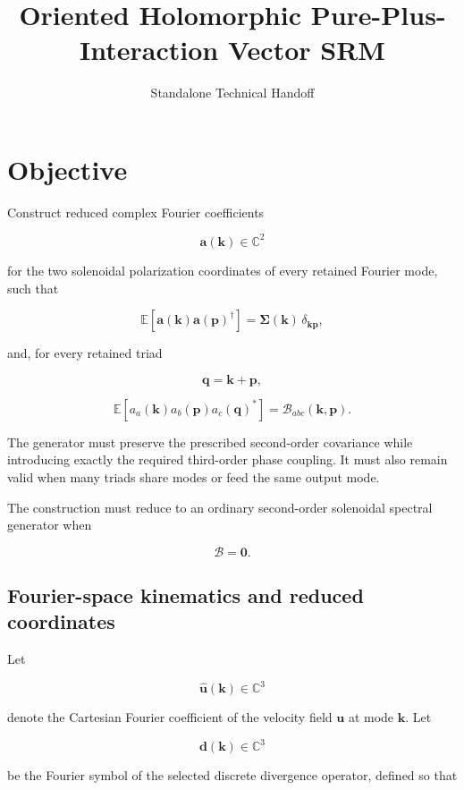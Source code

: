 \documentclass[
  11pt,
  a4paper,
]{article}
\title{Oriented Holomorphic Pure-Plus-Interaction Vector SRM}
\subtitle{Standalone Technical Handoff}
\author{}
\date{}
\begin{document}
\maketitle
\thispagestyle{empty}
\clearpage

{
\hypersetup{linkcolor=black}
\setcounter{tocdepth}{3}
\tableofcontents
}
\section{Objective}\label{objective}

Construct reduced complex Fourier coefficients

\[
\boldsymbol a(\boldsymbol k)\in\mathbb C^2
\]

for the two solenoidal polarization coordinates of every retained
Fourier mode, such that

\[
\mathbb E\!\left[
\boldsymbol a(\boldsymbol k)
\boldsymbol a(\boldsymbol p)^\dagger
\right]
=
\boldsymbol\Sigma(\boldsymbol k)\,
\delta_{\boldsymbol k\boldsymbol p},
\]

and, for every retained triad

\[
\boldsymbol q=\boldsymbol k+\boldsymbol p,
\]

\[
\mathbb E\!\left[
a_a(\boldsymbol k)
a_b(\boldsymbol p)
a_c(\boldsymbol q)^*
\right]
=
\mathcal B_{abc}(\boldsymbol k,\boldsymbol p).
\]

The generator must preserve the prescribed second-order covariance while
introducing exactly the required third-order phase coupling. It must
also remain valid when many triads share modes or feed the same output
mode.

The construction must reduce to an ordinary second-order solenoidal
spectral generator when

\[
\mathcal B=\boldsymbol0.
\]


\subsection{Fourier-space kinematics and reduced
coordinates}\label{fourier-space-kinematics-and-reduced-coordinates}

Let

\[
\widehat{\boldsymbol u}(\boldsymbol k)\in\mathbb C^3
\]

denote the Cartesian Fourier coefficient of the velocity field
\(\boldsymbol u\) at mode \(\boldsymbol k\). Let

\[
\boldsymbol d(\boldsymbol k)\in\mathbb C^3
\]

be the Fourier symbol of the selected discrete divergence operator,
defined so that
\end{document}
